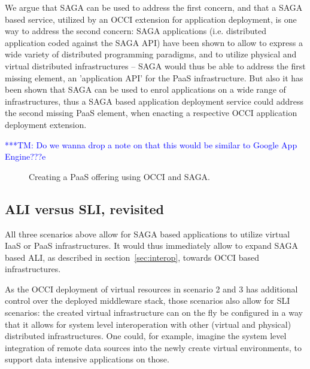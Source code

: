 \documentclass[10pt,conference,final,letterpaper,twoside,twocolumn,]{IEEEtran}
\newcommand{\tmnote}[1]{  {\textcolor{blue}    {***TM: #1}}}
\newcommand{\tmnote}[1]{}
\begin{document}
 We argue that SAGA can be used to address the first concern, and that
 a SAGA based service, utilized by an OCCI extension for application
 deployment, is one way to address the second concern:  SAGA
 applications (i.e. distributed application coded against the SAGA
 API) have been shown to allow to express a wide variety of
 distributed programming paradigms, and to utilize physical and
 virtual distributed infrastructures -- SAGA would thus be able to
 address the first missing element, an 'application API' for the PaaS
 infrastructure.  But also it has been shown that SAGA can be used to
 enrol applications on a wide range of infrastructures, thus a SAGA
 based application deployment service could address the second missing
 PaaS element, when enacting a respective OCCI application deployment
 extension.

\tmnote{Do we wanna drop a note on that this would be similar to
  Google App Engine???e}

\begin{figure}[htb]
 \caption{\label{fig:arch3} Creating a PaaS offering using OCCI and SAGA.}
\end{figure}

 \subsection{ALI versus SLI, revisited}

 All three scenarios above allow for SAGA based applications to
 utilize virtual IaaS or PaaS infrastructures.  It would thus
 immediately allow to expand SAGA based ALI, as described in
 section~\ref{sec:interop}, towards OCCI based infrastructures.

 As the OCCI deployment of virtual resources in scenario 2 and 3 has
 additional control over the deployed middleware stack, those
 scenarios also allow for SLI scenarios: the created virtual
 infrastructure can on the fly be configured in a way that it allows
 for system level interoperation with other (virtual and physical)
 distributed infrastructures.  One could, for example, imagine the
 system level integration of remote data sources into the newly create
 virtual environments, to support data intensive applications on
 those.
\end{document}
